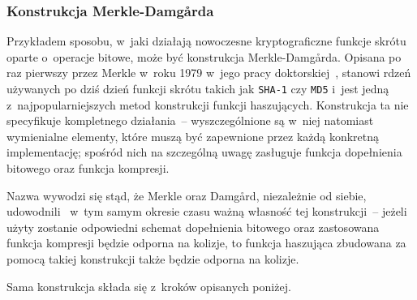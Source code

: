 \subsubsection{Konstrukcja Merkle-Damg\r{a}rda}
Przykładem sposobu, w~jaki działają nowoczesne kryptograficzne funkcje skrótu
oparte o~operacje bitowe, może być konstrukcja Merkle-Damg\r{a}rda. Opisana po
raz pierwszy przez Merkle w~roku 1979 w~jego pracy
doktorskiej~\cite{merkle_damgard_construction}, stanowi rdzeń używanych po dziś
dzień funkcji skrótu takich jak \texttt{SHA-1} czy \texttt{MD5} i~jest jedną
z~najpopularniejszych metod konstrukcji funkcji haszujących. Konstrukcja ta nie
specyfikuje kompletnego działania~-- wyszczególnione są w~niej natomiast
wymienialne elementy, które muszą być zapewnione przez każdą konkretną
implementację; spośród nich na szczególną uwagę zasługuje funkcja dopełnienia
bitowego oraz funkcja kompresji.

Nazwa wywodzi się stąd, że Merkle oraz Damg\r{a}rd, niezależnie od siebie,
udowodnili~\cite{merkle_damgard_security1,merkle_damgard_security2} w~tym samym
okresie czasu ważną własność tej konstrukcji~-- jeżeli użyty zostanie
odpowiedni schemat dopełnienia bitowego oraz zastosowana funkcja kompresji
będzie odporna na kolizje, to funkcja haszująca zbudowana za pomocą takiej
konstrukcji także będzie odporna na kolizje.

Sama konstrukcja składa się z~kroków opisanych poniżej.

